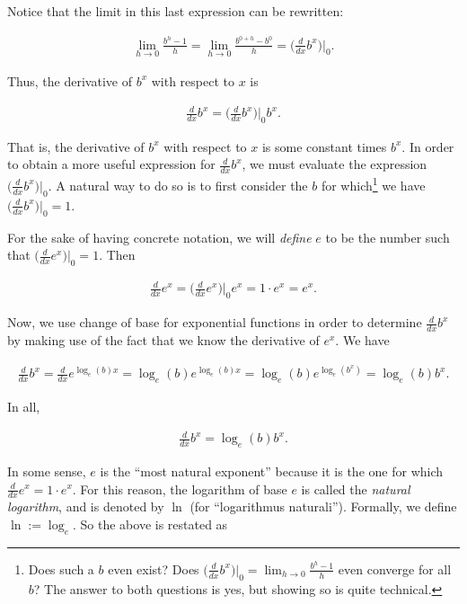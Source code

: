 \documentclass{article}
\begin{document}
Notice that the limit in this last expression can be rewritten:

\begin{align*}
    \lim_{h \rightarrow 0} \frac{b^h - 1}{h} = \lim_{h \rightarrow 0} \frac{b^{0 + h} - b^0}{h} = \Big( \frac{d}{dx} b^x \Big)\Big|_0.
\end{align*}

Thus, the derivative of $b^x$ with respect to $x$ is

\begin{align*}
   \frac{d}{dx} b^x = \Big( \frac{d}{dx} b^x \Big)\Big|_0 b^x.
\end{align*}

That is, the derivative of $b^x$ with respect to $x$ is some constant times $b^x$. In order to obtain a more useful expression for $\frac{d}{dx} b^x$, we must evaluate the expression $\Big( \frac{d}{dx} b^x \Big)\Big|_0$. A natural way to do so is to first consider the $b$ for which\footnote{Does such a $b$ even exist? Does $\Big( \frac{d}{dx} b^x \Big)\Big|_0 = \lim_{h \rightarrow 0} \frac{b^h - 1}{h}$ even converge for all $b$? The answer to both questions is yes, but showing so is quite technical.} we have $\Big( \frac{d}{dx} b^x \Big)\Big|_0 = 1$.

For the sake of having concrete notation, we will \textit{define} $e$ to be the number such that $\Big( \frac{d}{dx} e^x \Big)\Big|_0 = 1$. Then

\begin{align*}
    \frac{d}{dx} e^x = \Big( \frac{d}{dx} e^x \Big)\Big|_0 e^x = 1 \cdot e^x = e^x.
\end{align*}

Now, we use change of base for exponential functions in order to determine $\frac{d}{dx} b^x$ by making use of the fact that we know the derivative of $e^x$. We have

\begin{align*}
    \frac{d}{dx} b^x = \frac{d}{dx} e^{\log_e(b) x} = \log_e(b) e^{\log_e(b) x} = \log_e(b) e^{\log_e(b^x)} = \log_e(b) b^x.
\end{align*}

In all,

\begin{align*}
    \frac{d}{dx} b^x = \log_e(b) b^x.
\end{align*}

In some sense, $e$ is the ``most natural exponent'' because it is the one for which $\frac{d}{dx} e^x = 1 \cdot e^x$. For this reason, the logarithm of base $e$ is called the \textit{natural logarithm}, and is denoted by $\ln$ (for ``logarithmus naturali''). Formally, we define $\ln := \log_e$. So the above is restated as
\end{document}
